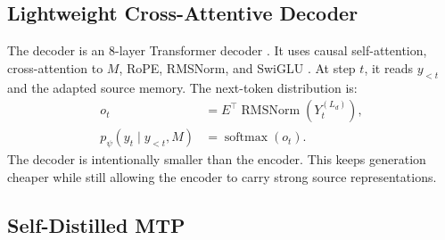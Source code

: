 \documentclass[11pt]{article}
\begin{document}
\subsection{Lightweight Cross-Attentive Decoder}

The decoder is an 8-layer Transformer decoder \citep{vaswani2017attention}.
It uses causal self-attention, cross-attention to $M$, RoPE, RMSNorm, and SwiGLU \citep{su2021roformer}.
At step $t$, it reads $y_{<t}$ and the adapted source memory.
The next-token distribution is:
\begin{equation}
\begin{aligned}
o_t&=E^\top\operatorname{RMSNorm}(Y^{(L_d)}_t),\\
p_{\psi}(y_t\mid y_{<t},M)&=\operatorname{softmax}(o_t).
\end{aligned}
\end{equation}
The decoder is intentionally smaller than the encoder.
This keeps generation cheaper while still allowing the encoder to carry strong source representations.

\subsection{Self-Distilled MTP}
\end{document}
